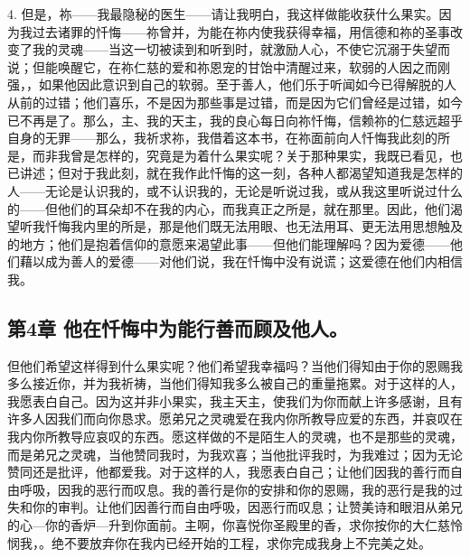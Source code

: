 4. 但是，祢——我最隐秘的医生——请让我明白，我这样做能收获什么果实。因为我过去诸罪的忏悔——祢曾并，为能在祢内使我获得幸福，用信德和祢的圣事改变了我的灵魂——当这一切被读到和听到时，就激励人心，不使它沉溺于失望而说；但能唤醒它，在祢仁慈的爱和祢恩宠的甘饴中清醒过来，软弱的人因之而刚强，，如果他因此意识到自己的软弱。至于善人，他们乐于听闻如今已得解脱的人从前的过错；他们喜乐，不是因为那些事是过错，而是因为它们曾经是过错，如今已不再是了。那么，主、我的天主，我的良心每日向祢忏悔，信赖祢的仁慈远超乎自身的无罪——那么，我祈求祢，我借着这本书，在祢面前向人忏悔我此刻的所是，而非我曾是怎样的，究竟是为着什么果实呢？关于那种果实，我既已看见，也已讲述；但对于我此刻，就在我作此忏悔的这一刻，各种人都渴望知道我是怎样的人——无论是认识我的，或不认识我的，无论是听说过我，或从我这里听说过什么的——但他们的耳朵却不在我的内心，而我真正之所是，就在那里。因此，他们渴望听我忏悔我内里的所是，那是他们既无法用眼、也无法用耳、更无法用思想触及的地方；他们是抱着信仰的意愿来渴望此事——但他们能理解吗？因为爱德——他们藉以成为善人的爱德——对他们说，我在忏悔中没有说谎；这爱德在他们内相信我。\par


\subsection{第4章 他在忏悔中为能行善而顾及他人。}

但他们希望这样得到什么果实呢？他们希望我幸福吗？当他们得知由于你的恩赐我多么接近你，并为我祈祷，当他们得知我多么被自己的重量拖累。对于这样的人，我愿表白自己。因为这并非小果实，我主天主，使我们为你而献上许多感谢，且有许多人因我们而向你恳求。愿弟兄之灵魂爱在我内你所教导应爱的东西，并哀叹在我内你所教导应哀叹的东西。愿这样做的不是陌生人的灵魂，也不是那些的灵魂，而是弟兄之灵魂，当他赞同我时，为我欢喜；当他批评我时，为我难过；因为无论赞同还是批评，他都爱我。对于这样的人，我愿表白自己；让他们因我的善行而自由呼吸，因我的恶行而叹息。我的善行是你的安排和你的恩赐，我的恶行是我的过失和你的审判。让他们因善行而自由呼吸，因恶行而叹息；让赞美诗和眼泪从弟兄的心---你的香炉---升到你面前。主啊，你喜悦你圣殿里的香，求你按你的大仁慈怜悯我，。绝不要放弃你在我内已经开始的工程，求你完成我身上不完美之处。\par

